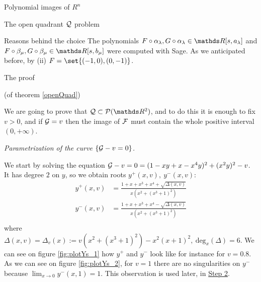 \documentclass[11pt, a4paper, english, twoside, notitlepage]{report}
\begin{document}
\begin{chapter}{Polynomial images of $R^n$}
\begin{section}{The open quadrant $\mathcal{Q}$ problem}
\begin{subsection}{Reasons behind the choice}
		The polynomials $F\circ\alpha_{\lambda }, G\circ\alpha_{\lambda} \in \R[s,a_{\lambda}]$ and $F\circ\beta_{\mu},G\circ\beta_{\mu} \in\R[s,b_{\mu}]$ were computed with Sage. As we anticipated before, by (ii) $F = \set{(-1, 0), (0, -1)}$.
		
	\end{subsection}
	
	\begin{subsection}{The proof}
		
		\begin{Proof}(of theorem \ref{openQuad})
			
			We are going to prove that $\Qu \subset \P(\R^2)$, and to do this it is enough to fix $v > 0$, and if $\mathcal{G} = v$ then the image of $\mathcal{F}$ must contain the whole positive interval $(0, +\infty)$.
			\begin{center}
				 \emph{Parametrization of the curve $\{\mathcal{G}-v=0\}$.}
			\end{center}\label{step1}

			We start by solving the equation $\mathcal{G}-v= 0 = (1 - xy + x - x^4 y)^2 + (x^2 y)^2 - v$. It has degree $2$ on $y$, so we obtain roots $y^+(x,v),\ y^-(x,v)$:
			\begin{equation*}
				\begin{aligned}
				y^+(x,v) & =\frac{1 + x + x^3 + x^4 + \sqrt{\Delta(x,v)}}{x(x^2 + (x^3 + 1)^2)}\\
				y^-(x,v) & =\frac{1 + x + x^3 + x^4 - \sqrt{\Delta(x,v)}}{x(x^2 + (x^3 + 1)^2)}\\
				\end{aligned}
			\end{equation*}
			where $\Delta(x,v) = \Delta_v(x):=v(x^2+(x^3+1)^2)-x^2(x+1)^2,\ \text{deg}_x(\Delta) = 6$. We can see on figure \ref{fig:plotYs_1} how $y^+$ and $y^-$ look like for instance for $v = 0.8$. As we can see on figure \ref{fig:plotYs_2}, for $v = 1$ there are no singularities on $y^-$ because $\lim_{x\rightarrow0} y^-(x, 1) = 1$. This observation is used later, in \hyperref[step2]{Step 2}.
			

\end{Proof}
\end{subsection}
\end{section}
\end{chapter}
\end{document}
